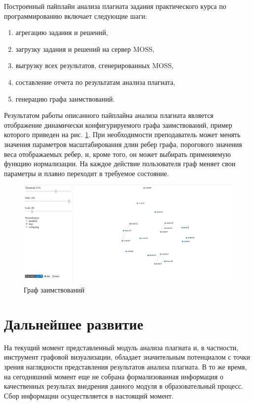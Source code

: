 \documentclass[a4paper,14pt]{extarticle}
\begin{document}
Построенный пайплайн анализа плагиата задания практического курса по программированию включает следующие шаги:
\begin{enumerate}
    \item агрегацию задания и решений,
    \item загрузку задания и решений на сервер MOSS,
    \item выгрузку всех результатов, сгенерированных MOSS,
    \item составление отчета по результатам анализа плагиата,
    \item генерацию графа заимствований.
\end{enumerate}

Результатом работы описанного пайплайна анализа плагиата является отображение динамически конфигурируемого графа заимствований, пример которого приведен на рис. \ref{fig:graph}. При необходимости преподаватель может менять значения параметров масштабирования длин ребер графа, порогового значения веса отображаемых ребер, и, кроме того, он может выбирать применяемую функцию нормализации. На каждое действие пользователя граф меняет свои параметры и плавно переходит в требуемое состояние.

\begin{figure}[h!]
\centering
\includegraphics[width=1.0\textwidth]{graph.png}
\caption{Граф заимствований}
\label{fig:graph}
\end{figure}

\section{Дальнейшее развитие}

На текущий момент представленный модуль анализа плагиата и, в частности, инструмент графовой визуализации, обладает значительным потенциалом с точки зрения наглядности представления результатов анализа плагиата. В то же время, на сегодняшний момент еще не собрана формализованная информация о качественных результах внедрения данного модуля в образовательный процесс. Сбор информации осуществляется в настоящий момент.
\end{document}
